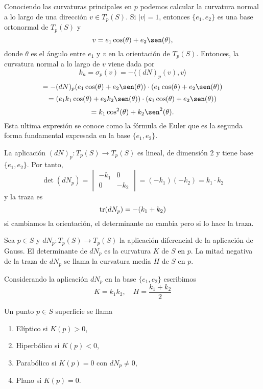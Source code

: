 \begin{note}
  Conociendo las curvaturas principales en $p$ podemos calcular la curvatura normal a lo largo de una dirección $v \in T_{p}(S)$. Si $| v | = 1$, entonces $\{ e_{1}, e_{2} \}$ es una base ortonormal de $T_{p}(S)$ y
  \[ 
    v = e_{1} \cos(\theta) + e_{2} \sen(\theta),
  \] 
  donde $\theta$ es el ángulo entre $e_{1}$ y $v$ en la orientación de $T_{p}(S)$. Entonces, la curvatura normal a lo largo de $v$ viene dada por
  \[ 
    k_{n} = \sigma_{p}(v) = - \langle (d N)_{p}(v){ , }v \rangle
  \] 
  \[ 
    = - (d N)_{p}(e_{1} \cos(\theta) + e_{2} \sen(\theta)) \cdot (e_{1} \cos(\theta) + e_{2} \sen(\theta)) 
  \] 
  \[ 
    = (e_{1} k_{1} \cos(\theta) + e_{2} k_{2} \sen(\theta)) \cdot (e_{1} \cos(\theta) + e_{2} \sen(\theta)) 
  \] 
  \[ 
    = k_{1} \cos^{2}(\theta) + k_{2} \sen^{2}(\theta).
  \] 
  Esta ultima expresión se conoce como la fórmula de Euler que es la segunda forma fundamental expresada en la base $\{ e_{1}, e_{2} \}$.
\end{note}

\begin{obs}
  La aplicación $(d N)_{p}: T_{p}(S) \to T_{p}(S)$ es lineal, de dimensión 2 y tiene base $\{ e_{1}, e_{2} \}$. Por tanto, 
  \[ 
    \det (dN_{p}) = 
    \begin{vmatrix}
       -k_{1} & 0 \\
       0 & -k_{2}
    \end{vmatrix}
    = (-k_{1})(-k_{2}) = k_{1} \cdot k_{2}
  \] 
  y la traza es
  \[ 
    \operatorname{tr} (dN_{p}) = -(k_{1} + k_{2}) 
  \] 
  si cambiamos la orientación, el determinante no cambia pero si lo hace la traza.
\end{obs}

\begin{defn}
  Sea $p \in S$ y $dN_{p} : T_{p}(S) \to T_{p}(S)$ la aplicación diferencial de la aplicación de Gauss. El determinante de $dN_{p}$ es la curvatura $K$ de $S$ en $p$. La mitad negativa de la traza de $dN_{p}$ se llama la curvatura media $H$ de $S$ en $p$.
\end{defn}

\begin{obs}
  Considerando la aplicación $dN_{p}$ en la base $\{ e_{1}, e_{2} \}$ escribimos
  \[ 
    K = k_{1} k_{2}, \quad H = \frac{k_{1} + k_{2}}{2}
  \] 
\end{obs}

\begin{defn}
  Un punto $p \in S$ superficie se llama
  \begin{enumerate}[label=(\roman*)]
    \item Elíptico si $K(p) > 0$,
    \item Hiperbólico si $K(p) < 0$,
    \item Parabólico si $K(p) = 0$ con $dN_{p} \neq 0$,
    \item Plano si $K(p) = 0$.
  \end{enumerate}
\end{defn}

